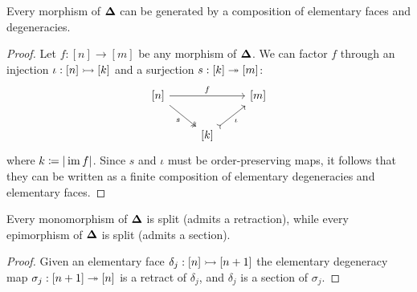 \begin{lemma}
\label{lem:elementary-maps-generate-simplex-maps}
Every morphism of \({\mathbf{\Delta}}\) can be generated by a composition of elementary
faces and degeneracies.
\end{lemma}

\begin{proof}
Let \(f: [n] \to [m]\) be any morphism of \({\mathbf{\Delta}}\). We can factor \(f\) through
an injection \(\iota: [n] \rightarrowtail [k]\) and a surjection \(s: [k] \twoheadrightarrow [m]\):
\[
\begin{tikzcd}
{[n]} \ar[rr, "f"] \ar[dr, two heads, "s"'] &&{[m]} \\
&{[k]} \ar[ru, tail, "\iota"'] &
\end{tikzcd}
\]
where \(k \coloneq |\operatorname{im} f|\). Since \(s\) and \(\iota\) must be order-preserving
maps, it follows that they can be written as a finite composition of elementary
degeneracies and elementary faces.
\end{proof}

\begin{corollary}
\label{cor:mono-and-epi-in-Splx-are-split-mono-and-epi}
Every monomorphism of \({\mathbf{\Delta}}\) is split (admits a retraction),
while every epimorphism of \({\mathbf{\Delta}}\) is split (admits a section).
\end{corollary}

\begin{proof}
Given an elementary face \(\delta_j: [n] \rightarrowtail [n+1]\) the elementary degeneracy
map \(\sigma_j: [n+1] \twoheadrightarrow [n]\) is a retract of \(\delta_j\), and \(\delta_j\)
is a section of \(\sigma_j\).
\end{proof}

